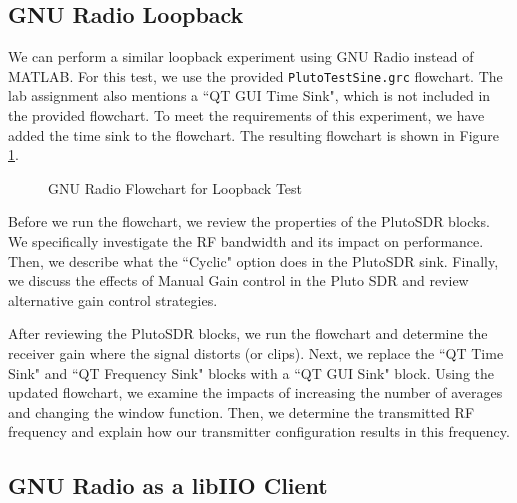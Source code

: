 \documentclass{article}
\begin{document}
\subsection{GNU Radio Loopback}
\label{section::gnu_radio_loopback}

We can perform a similar loopback experiment using GNU Radio instead of MATLAB. For this test, we use the provided \texttt{PlutoTestSine.grc} flowchart. The lab assignment also mentions a ``QT GUI Time Sink", which is not included in the provided flowchart. To meet the requirements of this experiment, we have added the time sink to the flowchart. The resulting flowchart is shown in Figure \ref{fig::gnu_radio_loopback_flowchart}.

\begin{figure}[H]
	\centerline{}
	\caption{GNU Radio Flowchart for Loopback Test}
	\label{fig::gnu_radio_loopback_flowchart}
\end{figure}

Before we run the flowchart, we review the properties of the PlutoSDR blocks. We specifically investigate the RF bandwidth and its impact on performance. Then, we describe what the ``Cyclic" option does in the PlutoSDR sink. Finally, we discuss the effects of Manual Gain control in the Pluto SDR and review alternative gain control strategies.

After reviewing the PlutoSDR blocks, we run the flowchart and determine the receiver gain where the signal distorts (or clips). Next, we replace the ``QT Time Sink" and ``QT Frequency Sink" blocks with a ``QT GUI Sink" block. Using the updated flowchart, we examine the impacts of increasing the number of averages and changing the window function. Then, we determine the transmitted RF frequency and explain how our transmitter configuration results in this frequency.

\subsection{GNU Radio as a libIIO Client}
\end{document}

